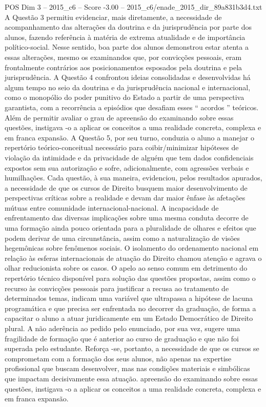 \begin{textsample}{POS Dim 3 – 2015\_c6 – Score -3.00 – 2015\_c6/enade\_2015\_dir\_89a831b3d4.txt}
A Questão 3 permitiu evidenciar, mais diretamente, a necessidade de acompanhamento das alterações da doutrina e da jurisprudência por parte dos alunos, fazendo referência à matéria de extrema atualidade e de importância político-social.
Nesse sentido, boa parte dos alunos demonstrou estar atenta a essas alterações, mesmo os examinandos que, por convicções pessoais, eram frontalmente contrários aos posicionamentos esposados pela doutrina e pela jurisprudência.
A Questão 4 confrontou ideias consolidadas e desenvolvidas há algum tempo no seio da doutrina e da jurisprudência nacional e internacional, como o monopólio do poder punitivo do Estado a partir de uma perspectiva garantista, com a recorrência a episódios que desafiam esses “ acordos ” teóricos.
Além de permitir avaliar o grau de apreensão do examinando sobre essas questões, instigava -o a aplicar os conceitos a uma realidade concreta, complexa e em franca expansão.
A Questão 5, por seu turno, conduzia o aluno a manejar o repertório teórico-conceitual necessário para coibir/minimizar hipóteses de violação da intimidade e da privacidade de alguém que tem dados confidenciais expostos sem sua autorização e sofre, adicionalmente, com agressões verbais e humilhações.
Cada questão, à sua maneira, evidenciou, pelos resultados apurados, a necessidade de que os cursos de Direito busquem maior desenvolvimento de perspectivas críticas sobre a realidade e devam dar maior ênfase às afetações mútuas entre comunidade internacional-nacional.
A incapacidade de enfrentamento das diversas implicações sobre uma mesma conduta decorre de uma formação ainda pouco orientada para a pluralidade de olhares e efeitos que podem derivar de uma circunstância, assim como a naturalização de visões hegemônicas sobre fenômenos sociais.
O isolamento do ordenamento nacional em relação às esferas internacionais de atuação do Direito chamou atenção e agrava o olhar reducionista sobre os casos.
O apelo ao senso comum em detrimento do repertório técnico disponível para solução das questões propostas, assim como o recurso às convicções pessoais para justificar a recusa ao tratamento de determinados temas, indicam uma variável que ultrapassa a hipótese de lacuna programática e que precisa ser enfrentada no decorrer da graduação, de forma a capacitar o aluno a atuar juridicamente em um Estado Democrático de Direito plural.
A não aderência ao pedido pelo enunciado, por sua vez, sugere uma fragilidade de formação que é anterior ao curso de graduação e que não foi superada pelo estudante.
Reforça -se, portanto, a necessidade de que os cursos se comprometam com a formação dos seus alunos, não apenas na expertise profissional que buscam desenvolver, mas nas condições materiais e simbólicas que impactam decisivamente essa atuação. apreensão do examinando sobre essas questões, instigava -o a aplicar os conceitos a uma realidade concreta, complexa e em franca expansão.

\end{textsample}
